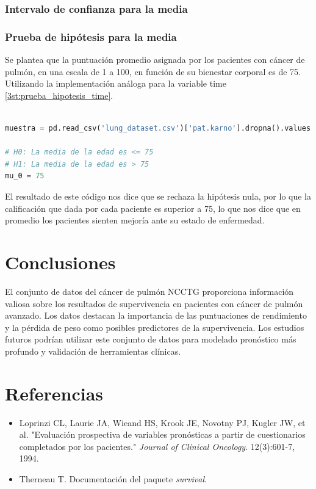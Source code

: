 \documentclass[a4paper,12pt]{article}
\begin{document}
    \subsubsection*{Intervalo de confianza para la media}

    \subsubsection*{Prueba de hipótesis para la media}

    Se plantea que la puntuación promedio asignada por los pacientes con cáncer de pulmón, en una escala de 1 a 100, en función de su bienestar corporal es de 75. Utilizando la implementación análoga para la variable time  \ref{3st:prueba_hipotesis_time}.

    \begin{lstlisting}[language=Python, caption={Código en Python para calcular el estimador de la prueba de hipotesis},label={3st:prueba_hipotesis_pat.karno}]
        
muestra = pd.read_csv('lung_dataset.csv')['pat.karno'].dropna().values

# H0: La media de la edad es <= 75
# H1: La media de la edad es > 75
mu_0 = 75  

    \end{lstlisting}

 El resultado de este código nos dice que se rechaza la hipótesis nula, por lo que la calificación que dada por cada paciente es superior a 75, lo que nos dice que en promedio los pacientes sienten mejoría ante su estado de enfermedad.
    

   

	\section*{Conclusiones}
	El conjunto de datos del cáncer de pulmón NCCTG proporciona información valiosa sobre los resultados de supervivencia en pacientes con cáncer de pulmón avanzado. Los datos destacan la importancia de las puntuaciones de rendimiento y la pérdida de peso como posibles predictores de la supervivencia. Los estudios futuros podrían utilizar este conjunto de datos para modelado pronóstico más profundo y validación de herramientas clínicas.
	
	\section*{Referencias}
	\begin{itemize}
		\item Loprinzi CL, Laurie JA, Wieand HS, Krook JE, Novotny PJ, Kugler JW, et al. "Evaluación prospectiva de variables pronósticas a partir de cuestionarios completados por los pacientes." \textit{Journal of Clinical Oncology}. 12(3):601-7, 1994.
		\item Therneau T. Documentación del paquete \textit{survival}.
	\end{itemize}
	
\end{document}

